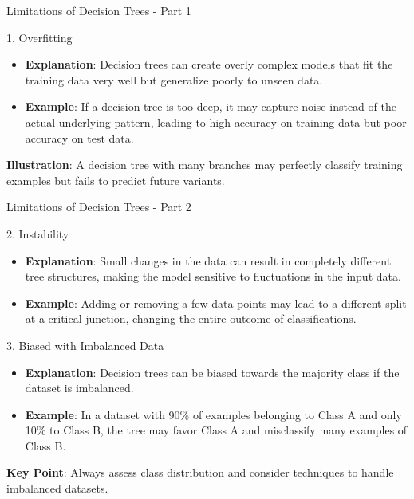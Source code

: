 \documentclass[aspectratio=169]{beamer}
\begin{document}
\begin{frame}[fragile]{Limitations of Decision Trees - Part 1}
  \begin{block}{1. Overfitting}
    \begin{itemize}
      \item \textbf{Explanation}: Decision trees can create overly complex models that fit the training data very well but generalize poorly to unseen data.
      \item \textbf{Example}: If a decision tree is too deep, it may capture noise instead of the actual underlying pattern, leading to high accuracy on training data but poor accuracy on test data.
    \end{itemize}
    \textbf{Illustration}: A decision tree with many branches may perfectly classify training examples but fails to predict future variants.
  \end{block}
\end{frame}

\begin{frame}[fragile]{Limitations of Decision Trees - Part 2}
  \begin{block}{2. Instability}
    \begin{itemize}
      \item \textbf{Explanation}: Small changes in the data can result in completely different tree structures, making the model sensitive to fluctuations in the input data.
      \item \textbf{Example}: Adding or removing a few data points may lead to a different split at a critical junction, changing the entire outcome of classifications.
    \end{itemize}
  \end{block}

  \begin{block}{3. Biased with Imbalanced Data}
    \begin{itemize}
      \item \textbf{Explanation}: Decision trees can be biased towards the majority class if the dataset is imbalanced.
      \item \textbf{Example}: In a dataset with 90\% of examples belonging to Class A and only 10\% to Class B, the tree may favor Class A and misclassify many examples of Class B.
    \end{itemize}
    \textbf{Key Point}: Always assess class distribution and consider techniques to handle imbalanced datasets.
  \end{block}
\end{frame}
\end{document}
